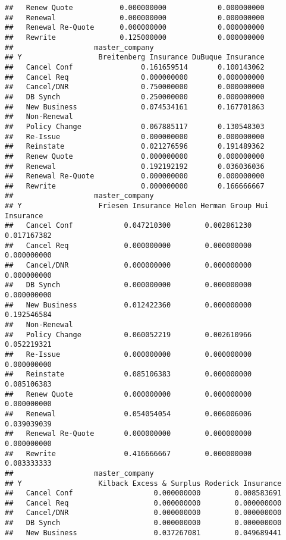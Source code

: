 \documentclass[]{article}
\begin{document}
\begin{verbatim}
##   Renew Quote           0.000000000            0.000000000
##   Renewal               0.000000000            0.000000000
##   Renewal Re-Quote      0.000000000            0.000000000
##   Rewrite               0.125000000            0.000000000
##                   master_company
## Y                  Breitenberg Insurance DuBuque Insurance
##   Cancel Conf                0.161659514       0.100143062
##   Cancel Req                 0.000000000       0.000000000
##   Cancel/DNR                 0.750000000       0.000000000
##   DB Synch                   0.250000000       0.000000000
##   New Business               0.074534161       0.167701863
##   Non-Renewal                                             
##   Policy Change              0.067885117       0.130548303
##   Re-Issue                   0.000000000       0.000000000
##   Reinstate                  0.021276596       0.191489362
##   Renew Quote                0.000000000       0.000000000
##   Renewal                    0.192192192       0.036036036
##   Renewal Re-Quote           0.000000000       0.000000000
##   Rewrite                    0.000000000       0.166666667
##                   master_company
## Y                  Friesen Insurance Helen Herman Group Hui Insurance
##   Cancel Conf            0.047210300        0.002861230   0.017167382
##   Cancel Req             0.000000000        0.000000000   0.000000000
##   Cancel/DNR             0.000000000        0.000000000   0.000000000
##   DB Synch               0.000000000        0.000000000   0.000000000
##   New Business           0.012422360        0.000000000   0.192546584
##   Non-Renewal                                                        
##   Policy Change          0.060052219        0.002610966   0.052219321
##   Re-Issue               0.000000000        0.000000000   0.000000000
##   Reinstate              0.085106383        0.000000000   0.085106383
##   Renew Quote            0.000000000        0.000000000   0.000000000
##   Renewal                0.054054054        0.006006006   0.039039039
##   Renewal Re-Quote       0.000000000        0.000000000   0.000000000
##   Rewrite                0.416666667        0.000000000   0.083333333
##                   master_company
## Y                  Kilback Excess & Surplus Roderick Insurance
##   Cancel Conf                   0.000000000        0.008583691
##   Cancel Req                    0.000000000        0.000000000
##   Cancel/DNR                    0.000000000        0.000000000
##   DB Synch                      0.000000000        0.000000000
##   New Business                  0.037267081        0.049689441

\end{verbatim}
\end{document}
